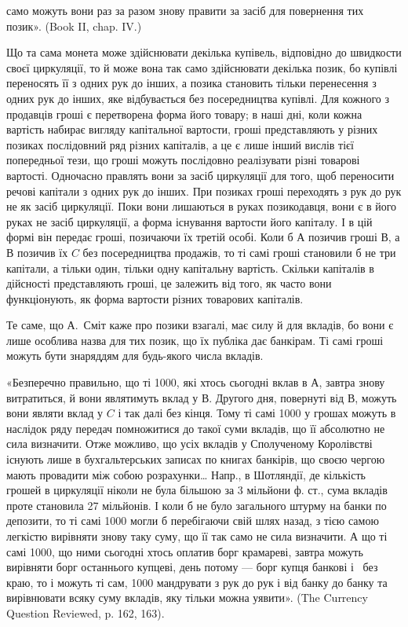 \parcont{}  %
само можуть вони раз за разом знову правити за засіб для повернення тих
позик». (Book II, chap. IV.)

Що та сама монета може здійснювати декілька купівель, відповідно до швидкости
своєї циркуляції, то й може вона так само здійснювати декілька позик, бо купівлі
переносять її з одних рук до інших, а позика становить тільки перенесення з одних
рук до інших, яке відбувається без посередництва купівлі. Для кожного з продавців
гроші є перетворена форма його товару; в наші дні, коли кожна вартість набирає
вигляду капітальної вартости, гроші представляють у різних позиках послідовний
ряд різних капіталів, а це є лише інший вислів тієї попередньої тези, що гроші
можуть послідовно реалізувати різні товарові вартості. Одночасно правлять
вони за засіб циркуляції для того, щоб переносити речові капітали з одних рук до
інших. При позиках гроші переходять з рук до рук не як засіб циркуляції. Поки
вони лишаються в руках позикодавця, вони є в його руках не засіб циркуляції, а
форма існування вартости його капіталу. І в цій формі він передає гроші, позичаючи
їх третій особі. Коли б $А$ позичив гроші $В$, а $В$ позичив їх $C$ без
посередництва продажів, то ті самі гроші становили б не три капітали, а тільки
один, тільки одну капітальну вартість. Скільки капіталів в дійсності представляють
гроші, це залежить від того, як часто вони функціонують, як форма
вартости різних товарових капіталів.

Те саме, що А.~Сміт каже про позики взагалі, має силу й для вкладів,
бо вони є лише особлива назва для тих позик, що їх публіка дає банкірам.
Ті самі гроші можуть бути знаряддям для будь-якого числа вкладів.

«Безперечно правильно, що ті 1000, які хтось сьогодні вклав в $А$,
завтра знову витратиться, й вони являтимуть вклад у $В$. Другого дня, повернуті
від $В$, можуть вони являти вклад у $C$ і так далі без кінця. Тому ті самі
1000 у грошах можуть в наслідок ряду передач помножитися до такої
суми вкладів, що її абсолютно не сила визначити. Отже можливо, що  усіх
вкладів у Сполученому Королівстві існують лише в бухгальтерських записах
по книгах банкірів, що своєю чергою мають провадити між собою розрахунки\dots{}
Напр., в Шотляндії, де кількість грошей в циркуляції ніколи не була більшою
за 3 мільйони ф. ст., сума вкладів проте становила 27 мільйонів. І коли б не
було загального штурму на банки по депозити, то ті самі 1000 могли б
перебігаючи свій шлях назад, з тією самою легкістю вирівняти знову таку суму,
що її так само не сила визначити. А що ті самі 1000, що ними сьогодні
хтось оплатив борг крамареві, завтра можуть вирівняти борг останнього купцеві,
день потому — борг купця банкові і~ без краю, то і можуть ті сам,
1000 мандрувати з рук до рук і від банку до банку та вирівнювати
всяку суму вкладів, яку тільки можна уявити». (The Currency Question Reviewed,
p. 162, 163).

